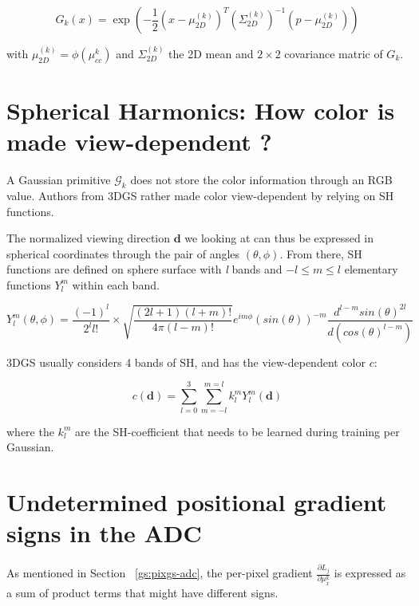 \begin{equation}
    G_{k}(x) = \exp(-\frac{1}{2}(x-\mu^{(k)}_{2D})^{T}(\Sigma^{(k)}_{2D})^{-1}(p-\mu^{(k)}_{2D}))
\end{equation}

with $\mu^{(k)}_{2D}= \phi(\mu_{cc}^{k})$ and $\Sigma^{(k)}_{2D}$ the 2D mean and $2\times2$ covariance matric of $G_{k}$. 


\section{Spherical Harmonics: How color is made view-dependent ?}
\label{appendix:gs-sh}

A Gaussian primitive $\mathcal{G}_{k}$ does not store the color information through an RGB value. Authors from 3D\ac{GS} rather made color view-dependent by relying on \ac{SH} functions. 

The normalized viewing direction $\mathbf{d}$ we looking at can thus be expressed in spherical coordinates through the pair of angles $(\theta,\phi)$. From there, \ac{SH} functions are defined on sphere surface with \textit{l} bands and $-l \leq  m \leq l$ elementary functions $Y_{l}^{m}$ within each band.

\begin{equation}
    Y_{l}^{m}(\theta,\phi) = \frac{(-1)^{l}}{2^{l}l!} \times \sqrt{\frac{(2l+1)(l+m)!}{4\pi(l-m)!}}e^{im\phi}(sin(\theta))^{-m}\frac{d^{l-m}sin(\theta)^{2l}}{d(cos(\theta)^{l-m})}
\end{equation}

3D\ac{GS} usually considers 4 bands of \ac{SH}, and has the view-dependent color $c$: 

\begin{equation}
    c(\mathbf{d}) = \sum_{l=0}^{3}\sum_{m=-l}^{m=l}k_{l}^{m}Y_{l}^{m}(\mathbf{d})
\end{equation}

\noindent where the $k_{l}^{m}$ are the \ac{SH}-coefficient that needs to be learned during training per Gaussian. 

\section{Undetermined positional gradient signs in the ADC}
\label{appendix:sign-gradient}

As mentioned in Section ~\ref{gs:pixgs-adc}, the per-pixel gradient $\frac{\partial L_{j}}{\partial \mu^{k}_{x}}$ is expressed as a sum of product terms that might have different signs. 

